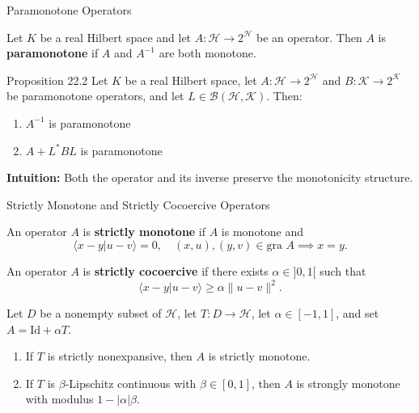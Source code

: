 \documentclass[aspectratio=169,10pt]{beamer}
\begin{document}
\begin{frame}{Paramonotone Operators}
    \begin{definition}
        Let $K$ be a real Hilbert space and let $A: \mathcal{H} \to 2^{\mathcal{H}}$ be an operator.
        Then $A$ is \textbf{paramonotone} if $A$ and $A^{-1}$ are both monotone.
    \end{definition}

    \begin{block}{Proposition 22.2}
        Let $K$ be a real Hilbert space, let $A: \mathcal{H} \to 2^{\mathcal{H}}$ and $B: \mathcal{K} \to 2^{\mathcal{K}}$ be
        paramonotone operators, and let $L \in \mathcal{B}(\mathcal{H}, \mathcal{K})$. Then:
        \begin{enumerate}
            \item[(i)] $A^{-1}$ is paramonotone
            \item[(ii)] $A + L^* B L$ is paramonotone
        \end{enumerate}
    \end{block}

    \vspace{0.5cm}
    \textbf{Intuition:} Both the operator and its inverse preserve the monotonicity structure.
\end{frame}

\begin{frame}{Strictly Monotone and Strictly Cocoercive Operators}
    \begin{definition}
        An operator $A$ is \textbf{strictly monotone} if $A$ is monotone and
        $$\langle x - y | u - v \rangle = 0, \quad (x,u), (y,v) \in \text{gra } A \implies x = y.$$
    \end{definition}

    \begin{definition}
        An operator $A$ is \textbf{strictly cocoercive} if there exists $\alpha \in ]0,1[$ such that
        $$\langle x - y | u - v \rangle \geq \alpha \|u - v\|^2.$$
    \end{definition}

    \vspace{0.5cm}
    \begin{example}[22.6]
        Let $D$ be a nonempty subset of $\mathcal{H}$, let $T: D \to \mathcal{H}$, let $\alpha \in [-1,1]$, and set $A = \text{Id} + \alpha T$.
        \begin{enumerate}
            \item[(i)] If $T$ is strictly nonexpansive, then $A$ is strictly monotone.
            \item[(ii)] If $T$ is $\beta$-Lipschitz continuous with $\beta \in [0,1]$, then $A$ is strongly monotone
                      with modulus $1 - |\alpha|\beta$.
        \end{enumerate}
    \end{example}
\end{frame}
\end{document}
